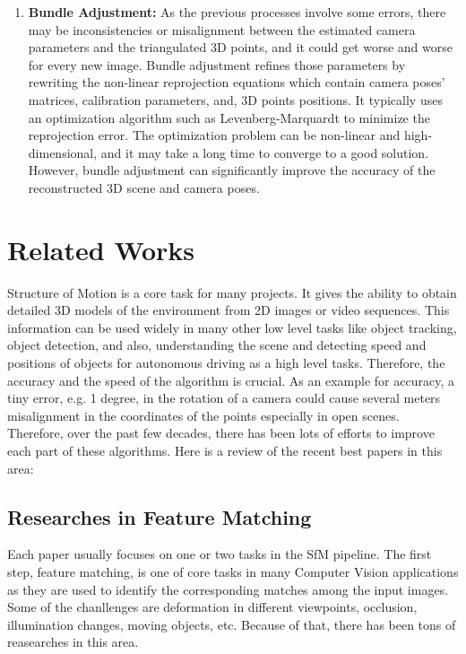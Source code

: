 \documentclass[11pt]{article}
\begin{document}
\begin{enumerate}
        \item \textbf{Bundle Adjustment:} As the previous processes involve some errors, there may be inconsistencies
        or misalignment between the estimated camera parameters and the triangulated 3D points, and it could get worse
        and worse for every new image. Bundle adjustment refines those parameters by rewriting the non-linear
        reprojection equations which contain camera poses' matrices, calibration parameters, and, 3D points positions.
        It typically uses an optimization algorithm such as Levenberg-Marquardt to minimize
        the reprojection error. The optimization problem can be non-linear and high-dimensional, and it may take a
        long time to converge to a good solution. However, bundle adjustment can significantly improve the accuracy
        of the reconstructed 3D scene and camera poses.

    \end{enumerate}

    \newpage
    \section{Related Works}
    Structure of Motion is a core task for many projects. It gives the ability to obtain detailed 3D models
    of the environment from 2D images or video sequences. This information can be used widely in many other
    low level tasks like object tracking, object detection, and also, understanding the scene and detecting speed and
    positions of objects for autonomous driving as a high level tasks. Therefore, the accuracy and the speed
    of the algorithm is crucial. As an example for accuracy, a tiny error, e.g. 1 degree, in the rotation of
    a camera could cause several meters misalignment in the coordinates of the points especially in open scenes.
    Therefore, over the past few decades, there has been lots of efforts to improve each part of these algorithms.
    Here is a review of the recent best papers in this area:

    \newpage
    \subsection{Researches in Feature Matching}
    Each paper usually focuses on one or two tasks in the SfM pipeline. The first step, feature matching,
    is one of core tasks in many Computer Vision applications as they are used to identify the corresponding
    matches among the input images. Some of the chanllenges are deformation in different viewpoints, occlusion,
    illumination changes, moving objects, etc. Because of that, there has been tons of reasearches in this area.
\end{document}
